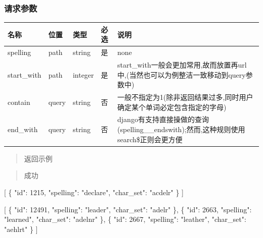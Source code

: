 \documentclass[
]{article}
\newenvironment{Shaded}{}{}
\newcommand{\DataTypeTok}[1]{\textcolor[rgb]{0.56,0.13,0.00}{#1}}
\newcommand{\DecValTok}[1]{\textcolor[rgb]{0.25,0.63,0.44}{#1}}
\newcommand{\FunctionTok}[1]{\textcolor[rgb]{0.02,0.16,0.49}{#1}}
\newcommand{\OtherTok}[1]{\textcolor[rgb]{0.00,0.44,0.13}{#1}}
\newcommand{\StringTok}[1]{\textcolor[rgb]{0.25,0.44,0.63}{#1}}
\begin{document}
\hypertarget{ux8bf7ux6c42ux53c2ux6570-5}{%
\subsubsection{请求参数}\label{ux8bf7ux6c42ux53c2ux6570-5}}

\begin{longtable}[]{@{}lllll@{}}
\toprule
名称 & 位置 & 类型 & 必选 & 说明 \\
\midrule
\endhead
spelling & path & string & 是 & none \\
start\_with & path & integer & 是 &
start\_with一般会更加常用,故而放置再url中,(当然也可以为例整洁一致移动到query参数中) \\
contain & query & string & 否 &
一般不指定为1(除非返回结果过多,同时用户确定某个单词必定包含指定的字母) \\
end\_with & query & string & 否 &
django有支持直接操做的查询(spelling\_\_endswith);然而,这种规则使用search\$正则会更方便 \\
\bottomrule
\end{longtable}

\begin{quote}
返回示例
\end{quote}

\begin{quote}
成功
\end{quote}

\begin{Shaded}
\begin{Highlighting}[]
\OtherTok{[}
  \FunctionTok{\{}
    \DataTypeTok{"id"}\FunctionTok{:} \DecValTok{1215}\FunctionTok{,}
    \DataTypeTok{"spelling"}\FunctionTok{:} \StringTok{"declare"}\FunctionTok{,}
    \DataTypeTok{"char\_set"}\FunctionTok{:} \StringTok{"acdelr"}
  \FunctionTok{\}}
\OtherTok{]}
\end{Highlighting}
\end{Shaded}

\begin{Shaded}
\begin{Highlighting}[]
\OtherTok{[}
  \FunctionTok{\{}
    \DataTypeTok{"id"}\FunctionTok{:} \DecValTok{12491}\FunctionTok{,}
    \DataTypeTok{"spelling"}\FunctionTok{:} \StringTok{"leader"}\FunctionTok{,}
    \DataTypeTok{"char\_set"}\FunctionTok{:} \StringTok{"adelr"}
  \FunctionTok{\}}\OtherTok{,}
  \FunctionTok{\{}
    \DataTypeTok{"id"}\FunctionTok{:} \DecValTok{2663}\FunctionTok{,}
    \DataTypeTok{"spelling"}\FunctionTok{:} \StringTok{"learned"}\FunctionTok{,}
    \DataTypeTok{"char\_set"}\FunctionTok{:} \StringTok{"adelnr"}
  \FunctionTok{\}}\OtherTok{,}
  \FunctionTok{\{}
    \DataTypeTok{"id"}\FunctionTok{:} \DecValTok{2667}\FunctionTok{,}
    \DataTypeTok{"spelling"}\FunctionTok{:} \StringTok{"leather"}\FunctionTok{,}
    \DataTypeTok{"char\_set"}\FunctionTok{:} \StringTok{"aehlrt"}
  \FunctionTok{\}}
\OtherTok{]}
\end{Highlighting}
\end{Shaded}
\end{document}
